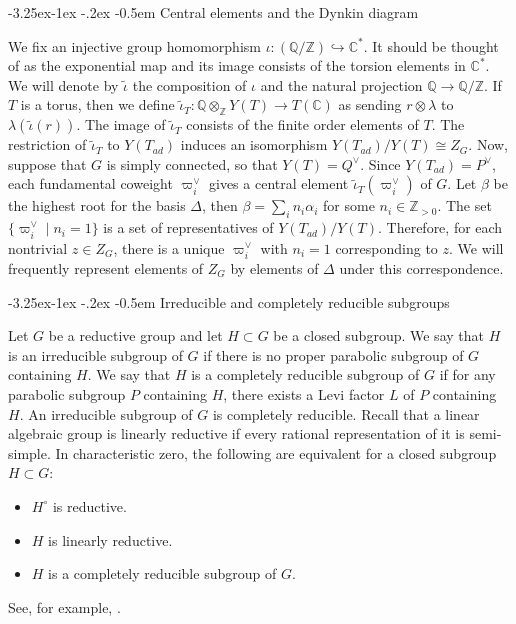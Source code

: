 \documentclass[11pt,oneside,dvipsnames]{amsart}
\makeatletter
\renewcommand\subsection{\@startsection{subsection}{3}{\z@}%
                                     {-3.25ex\@plus -1ex \@minus -.2ex}%
                                     {-0.5em}%
                                     {\normalfont\normalsize\bfseries}}
\theoremstyle{plain}
\theoremstyle{definition}
\theoremstyle{named}
\makeatother
\begin{document}
\subsection{Central elements and the Dynkin diagram}\label{subsec-FOSS}\hfill 

We fix an injective group homomorphism $\iota:(\mathbb{Q}/\mathbb{Z})\hookrightarrow \mathbb{C}^{\ast}$. It should be thought of as the exponential map and its image consists of the torsion elements in $\mathbb{C}^{\ast}$. We will denote by $\tilde{\iota}$ the composition of $\iota$ and the natural projection $\mathbb{Q}\rightarrow\mathbb{Q}/\mathbb{Z}$. If $T$ is a torus, then we define $\tilde{\iota}_T:\mathbb{Q}\otimes_{\mathbb{Z}}Y(T)\rightarrow T(\mathbb{C})$ as sending $r\otimes\lambda$ to $\lambda(\tilde{\iota}(r))$. The image of $\tilde{\iota}_T$ consists of the finite order elements of $T$. The restriction of $\tilde{\iota}_T$ to $Y(T_{ad})$ induces an isomorphism $Y(T_{ad})/Y(T)\cong Z_G$. Now, suppose that $G$ is simply connected, so that $Y(T)=Q^{\vee}$. Since $Y(T_{ad})=P^{\vee}$, each fundamental coweight $\varpi_i^{\vee}$ gives a central element $\tilde{\iota}_T(\varpi_i^{\vee})$ of $G$. Let $\beta$ be the highest root for the basis $\Delta$, then $\beta=\sum_in_i\alpha_i$ for some $n_i\in\mathbb{Z}_{>0}$. The set $\{\varpi_i^{\vee}\mid n_i=1\}$ is a set of representatives of $Y(T_{ad})/Y(T)$. Therefore, for each nontrivial $z\in Z_G$, there is a unique $\varpi_i^{\vee}$ with $n_i=1$ corresponding to $z$. We will frequently represent elements of $Z_G$ by elements of $\Delta$ under this correspondence.

\subsection{Irreducible and completely reducible subgroups}\hfill

Let $G$ be a reductive group and let $H\subset G$ be a closed subgroup. We say that $H$ is an irreducible subgroup of $G$ if there is no proper parabolic subgroup of $G$ containing $H$. We say that $H$ is a completely reducible subgroup of $G$ if for any parabolic subgroup $P$ containing $H$, there exists a Levi factor $L$ of $P$ containing $H$. An irreducible subgroup of $G$ is completely reducible. Recall that a linear algebraic group is linearly reductive if every rational representation of it is semi-simple. In characteristic zero, the following are equivalent for a closed subgroup $H\subset G$:
\begin{itemize}
\item $H^{\circ}$ is reductive.
\item $H$ is linearly reductive.
\item $H$ is a completely reducible subgroup of $G$. 
\end{itemize}
See, for example, \cite[Section 2.2 and Section 2.4]{BMR}. 
\end{document}
